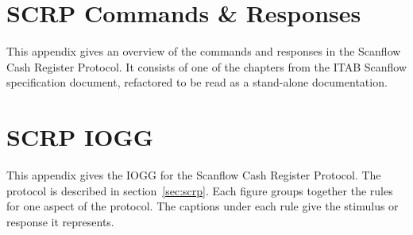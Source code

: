   \newpage
  \chapter{SCRP Commands \& Responses}\label{app:scrp-specification}
  This appendix gives an overview of the commands and responses in the Scanflow Cash Register Protocol. It consists of one of the chapters from the ITAB Scanflow specification document, refactored to be read as a stand-alone documentation.
  

  \newpage
  \chapter{SCRP IOGG}\label{app:scrp-gg}
  This appendix gives the IOGG for the Scanflow Cash Register Protocol. The protocol is described in section~\ref{sec:scrp}. Each figure groups together the rules for one aspect of the protocol. The captions under each rule give the stimulus or response it represents.
  